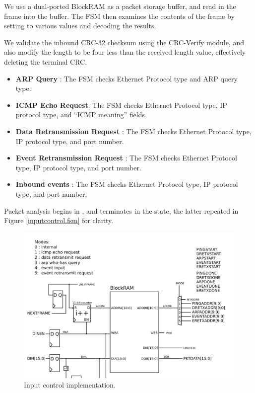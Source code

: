 We use a dual-ported BlockRAM as a packet storage buffer, and read in
the frame into the buffer. The FSM then examines the contents of the
frame by setting  to various values and decoding the
results.

We validate the inbound CRC-32 checksum using the CRC-Verify module,
and also modify the length to be four less than the received length
value, effectively deleting the terminal CRC. 

\begin{itemize}
\item \textbf{ARP Query} : The FSM checks Ethernet Protocol type and
  ARP query type.
\item \textbf{ICMP Echo Request}: The FSM checks Ethernet Protocol
  type, IP protocol type, and ``ICMP meaning'' fields.
\item \textbf{Data Retransmission Request} : The FSM checks Ethernet
  Protocol type, IP protocol type, and port number.
\item \textbf{Event Retransmission Request} : The FSM checks Ethernet
  Protocol type, IP protocol type, and port number.
\item \textbf{Inbound events} : The FSM checks Ethernet Protocol type,
  IP protocol type, and port number.
\end{itemize}

Packet analysis begins in , and terminates in the
 state, the latter repeated in Figure
\ref{inputcontrol.fsm} for clarity.

\begin{figure}
\begin{centering}
\includegraphics[scale=0.8]{inputcontrol.svg}
\end{centering}
\caption{Input control implementation.}
\label{inputcontrol}
\end{figure}

